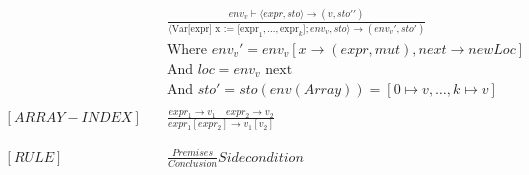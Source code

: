 \begin{align*}
    [ARRAY-DECL] \quad  &
    \frac
    {env_v \vdash\langle expr, sto\rangle\to (v, sto\prime \prime)}
    {\langle\text{Var[expr] x := } \text{[expr}_1, \dots, \text{expr}_k\text{]}; env_v,sto\rangle \to (env_v\prime, sto\prime)} \\
                        & \text{Where } env_v\prime = env_v[x \to (expr, mut), next \to new Loc]                                \\
                        & \text{And } loc = env_v \text{ next}                                                                  \\
                        & \text{And } sto\prime = sto(env(Array)) = [0 \mapsto v, \dots, k \mapsto v]
    \\
    \\
    [ARRAY-INDEX] \quad &
    \frac
    {expr_1 \rightarrow v_1 \quad expr_2 \rightarrow v_2}
    {expr_1[expr_2] \rightarrow v_1[v_2]}
    \\
    \\
    \\
    [RULE]     \quad    &
    \frac
    {Premises}
    {Conclusion}
    Side condition
\end{align*}

